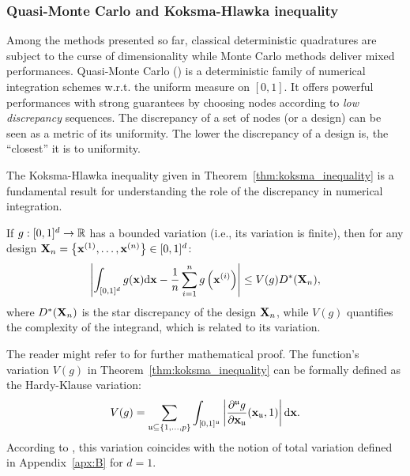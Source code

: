 \subsubsection{Quasi-Monte Carlo and Koksma-Hlawka inequality}

Among the methods presented so far, classical deterministic quadratures are subject to the curse of dimensionality while Monte Carlo methods deliver mixed performances. 
Quasi-Monte Carlo () is a deterministic family of numerical integration schemes w.r.t. the uniform measure on $[0, 1]$. 
It offers powerful performances with strong guarantees by choosing nodes according to \textit{low discrepancy} sequences. 
The discrepancy of a set of nodes (or a design) can be seen as a metric of its uniformity. 
The lower the discrepancy of a design is, the ``closest'' it is to uniformity. 

The Koksma-Hlawka inequality given in Theorem~\ref{thm:koksma_inequality} \citep{morokoff_1995,leobacher_2014} is a fundamental result for understanding the role of the discrepancy in numerical integration. 
\begin{theorem}\label{thm:koksma_inequality}
    If $g:[0, 1]^d\rightarrow\mathbb{R}$ has a bounded variation (i.e., its variation is finite), then for any design ${\bf X}_n = \left\{{\bf x}^{(1)}, \dots, {\bf x}^{(n)}\right\} \in [0, 1]^d$:
    \begin{equation}
        \left| \int_{[0, 1]^d} g({\bf x}) \mathrm{d}{\bf x} - \frac1n \sum_{i=1}^n g\left({\bf x}^{(i)}\right)\right| \leq  V(g) D^*({\bf X}_n),
    \end{equation}
    where $D^*({\bf X}_n)$ is the star discrepancy of the design ${\bf X}_n$, while $V(g)$ quantifies the complexity of the integrand, which is related to its variation. 
\end{theorem}

The reader might refer to \citet[Sec. 3.4]{leobacher_2014} for further mathematical proof.
The function's variation $V(g)$ in Theorem~\ref{thm:koksma_inequality} can be formally defined as the Hardy-Klause variation: 
\begin{equation}
    V(g) = \sum_{\mathfrak{u}\subseteq\{1, \dots, p \}} \int_{[0, 1]^\mathfrak{u}} \left| \frac{\partial^{\mathfrak{u}}g}{\partial {\bf x}_{\mathfrak{u}}}({\bf x}_{\mathfrak{u}}, 1)\right| \mathrm{d}{\bf x}.
\end{equation}
According to \citealp[p.188]{sullivan_2015}, this variation coincides with the notion of total variation defined in Appendix~\ref{apx:B} for $d=1$.

